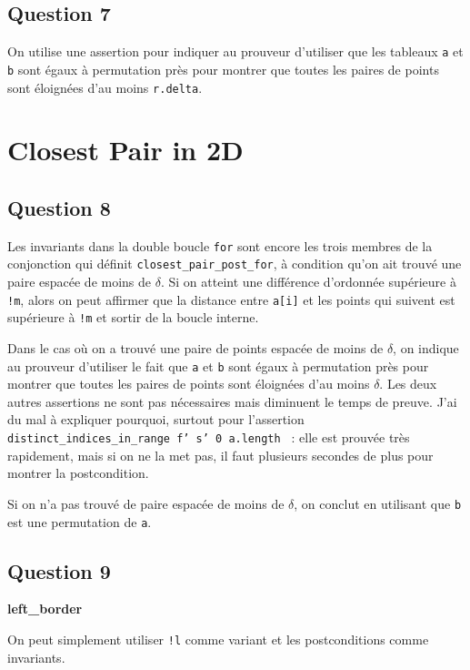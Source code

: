 \documentclass[11pt, openany, a4paper]{article}
\newcommand{\clofor}{\texttt{closest\_pair\_post\_for}}
\begin{document}
\subsection*{Question 7} 

On utilise une assertion pour indiquer au prouveur d'utiliser que les tableaux \texttt{a} et \texttt{b} sont égaux à permutation près pour montrer que toutes les paires de points sont éloignées d'au moins \texttt{r.delta}.

\section{Closest Pair in 2D}

\subsection*{Question 8}

Les invariants dans la double boucle \texttt{for} sont encore les trois membres de la conjonction qui définit \clofor, à condition qu'on ait trouvé une paire espacée de moins de $\delta$. Si on atteint une différence d'ordonnée supérieure à \texttt{!m}, alors on peut affirmer que la distance entre \texttt{a[i]} et les points qui suivent est supérieure à \texttt{!m} et sortir de la boucle interne.

Dans le cas où on a trouvé une paire de points espacée de moins de $\delta$, on indique au prouveur d'utiliser le fait que \texttt{a} et \texttt{b} sont égaux à permutation près pour montrer que toutes les paires de points sont éloignées d'au moins $\delta$. Les deux autres assertions ne sont pas nécessaires mais diminuent le temps de preuve. J'ai du mal à expliquer pourquoi, surtout pour l'assertion \texttt{ distinct\_indices\_in\_range f' s' 0 a.length } : elle est prouvée très rapidement, mais si on ne la met pas, il faut plusieurs secondes de plus pour montrer la postcondition.

Si on n'a pas trouvé de paire espacée de moins de $\delta$, on conclut en utilisant que \texttt{b} est une permutation de \texttt{a}.

\subsection*{Question 9}

\textbf{left\_border}

On peut simplement utiliser \texttt{!l} comme variant et les postconditions comme invariants.
\end{document}
